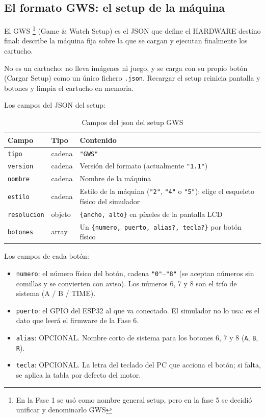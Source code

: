 \subsection*{El formato GWS: el setup de la máquina}
\label{sec:F1A01GWS}

El GWS \footnote{En la Fase 1 se usó como nombre general setup, pero en la fase 5 se decidió unificar y denominarlo GWS} (Game \& Watch Setup) es el JSON que define el HARDWARE destino final: describe la
máquina fija sobre la que se cargan y ejecutan finalmente los cartucho. 

No es un cartucho: no lleva imágenes ni juego, y se carga con su propio botón (Cargar
Setup) como un único fichero \texttt{.json}. Recargar el setup
reinicia pantalla y botones y limpia el cartucho en memoria.

Los campos del JSON del setup:

\begin{table}[H]
	\centering
	\begin{tabular}{llp{10cm}}
		\toprule
		Campo & Tipo & Contenido \\
		\midrule
		\texttt{tipo} & cadena & \texttt{"GWS"}\footnotemark \\
		\texttt{version} & cadena & Versión del formato (actualmente \texttt{"1.1"}) \\
		\texttt{nombre} & cadena & Nombre de la máquina \\
		\texttt{estilo} & cadena & Estilo de la máquina (\texttt{"2"}, \texttt{"4"} o \texttt{"5"}): elige el esqueleto físico del simulador \\
		\texttt{resolucion} & objeto & \texttt{\{ancho, alto\}} en píxeles de la pantalla LCD \\
		\texttt{botones} & array & Un \texttt{\{numero, puerto, alias?, tecla?\}} por botón físico \\
		\bottomrule
	\end{tabular}
	\caption{Campos del json del setup GWS}
	\label{tab:F1A01GWS}
\end{table}


Los campos de cada botón:

\begin{itemize}
	\item \texttt{numero}: el número físico del botón, cadena
	\texttt{"0"}--\texttt{"8"} (se aceptan números sin comillas y se
	convierten con aviso). Los números 6, 7 y 8 son el trío de sistema
	(A / B / TIME).
	\item \texttt{puerto}: el GPIO del ESP32 al que va conectado. El
	simulador no lo usa: es el dato que leerá el firmware de la Fase 6.
	\item \texttt{alias}: OPCIONAL. Nombre corto de sistema para los
	botones 6, 7 y 8 (\texttt{A}, \texttt{B}, \texttt{R}).
	\item \texttt{tecla}: OPCIONAL. La letra del teclado del PC que
	acciona el botón; si falta, se aplica la tabla por defecto del
	motor.
\end{itemize}


